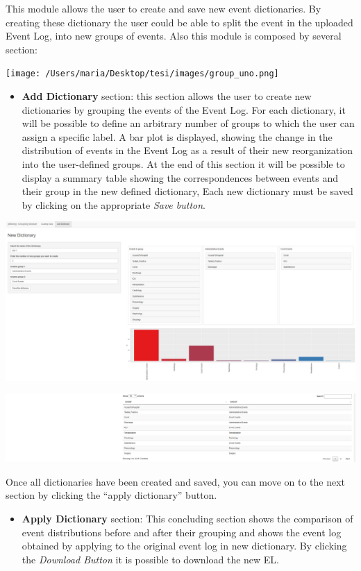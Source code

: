 \documentclass[
]{book}
\providecommand{\tightlist}{%
  \setlength{\itemsep}{0pt}\setlength{\parskip}{0pt}}
\begin{document}
This module allows the user to create and save new event dictionaries. By creating these dictionary the user could be able to split the event in the uploaded Event Log, into new groups of events.
Also this module is composed by several section:

\texttt{[image: /Users/maria/Desktop/tesi/images/group\_uno.png]}

\begin{itemize}
\tightlist
\item
  \textbf{Add Dictionary} section: this section allows the user to create new dictionaries by grouping the events of the Event Log.
  For each dictionary, it will be possible to define an arbitrary number of groups to which the user can assign a specific label.
  A bar plot is displayed, showing the change in the distribution of events in the Event Log as a result of their new reorganization into the user-defined groups. At the end of this section it will be possible to display a summary table showing the correspondences between events and their group in the new defined dictionary,
  Each new dictionary must be saved by clicking on the appropriate \emph{Save button}.
\end{itemize}

\includegraphics[width=1\textwidth,height=\textheight]{images/gmod2.png}

\includegraphics[width=1\textwidth,height=\textheight]{images/gmod2_1.png}

Once all dictionaries have been created and saved, you can move on to the next section by clicking the ``apply dictionary'' button.

\begin{itemize}
\tightlist
\item
  \textbf{Apply Dictionary} section: This concluding section shows the comparison of event distributions before and after their grouping and shows the event log obtained by applying to the original event log in new dictionary. By clicking the \emph{Download Button} it is possible to download the new EL.
\end{itemize}
\end{document}
